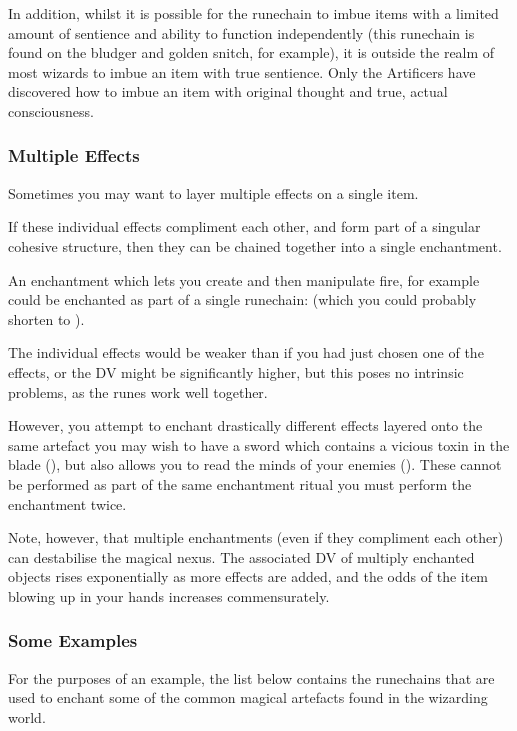 In addition, whilst it is possible for the runechain \rune{\aeternum\cingo\sensus} to imbue items with a limited amount of sentience and ability to function independently (this runechain is found on the bludger and golden snitch, for example), it is outside the realm of most wizards to imbue an item with true sentience. Only the Artificers have discovered how to imbue an item with original thought and true, actual consciousness. 

\subsubsection{Multiple Effects}

Sometimes you may want to layer multiple effects on a single item. 

If these individual effects compliment each other, and form part of a singular cohesive structure, then they can be chained together into a single enchantment. 

An enchantment which lets you create and then manipulate fire, for example could be enchanted as part of a single runechain: \rune{\lentus\genero\ignis\lentus\imperum\ignis} (which you could probably shorten to \rune{\lentus\genero\imperum\ignis}). 

The individual effects would be weaker than if you had just chosen one of the effects, or the DV might be significantly higher, but this poses no intrinsic problems, as the runes work well together. 

However, you attempt to enchant drastically different effects layered onto the same artefact \minus{} you may wish to have a sword which contains a vicious toxin in the blade (\rune{\velox\perdero\morbus}), but also allows you to read the minds of your enemies (\rune{\aeternum\discite\sensus}). These cannot be performed as part of the same enchantment ritual \minus{} you must perform the enchantment twice. 

Note, however, that multiple enchantments (even if they compliment each other) can destabilise the magical nexus. The associated DV of multiply enchanted objects rises exponentially as more effects are added, and the odds of the item blowing up in your hands increases commensurately.  

\subsubsection{Some Examples}

For the purposes of an example, the list below contains the runechains that are used to enchant some of the common magical artefacts found in the wizarding world. 


